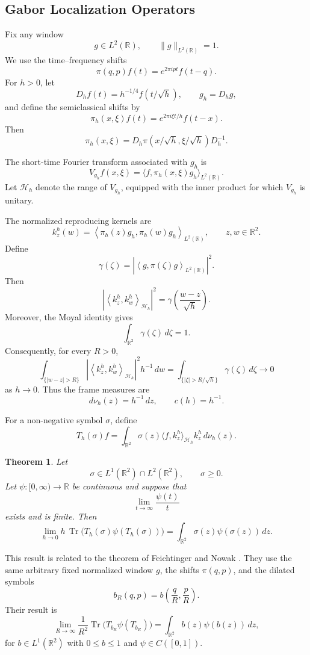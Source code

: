 \documentclass{amsart}
\newtheorem{thm}{Theorem}[section]
\theoremstyle{definition}
\theoremstyle{remark}
\numberwithin{equation}{section}
\begin{document}
\subsection{Gabor Localization Operators}

Fix any window
\[
g\in L^2(\mathbb R),
\qquad
\|g\|_{L^2(\mathbb R)}=1.
\]
We use the time--frequency shifts
\[
\pi(q,p)f(t)=e^{2\pi i pt}f(t-q).
\]
For $h>0$, let
\[
D_hf(t)=h^{-1/4}f(t/\sqrt h),
\qquad
g_h=D_hg,
\]
and define the semiclassical shifts by
\[
\pi_h(x,\xi)f(t)
=
e^{2\pi i \xi t/h}f(t-x).
\]
Then
\[
\pi_h(x,\xi)
=
D_h\pi(x/\sqrt h,\xi/\sqrt h)D_h^{-1}.
\]

The short-time Fourier transform associated with $g_h$ is
\[
V_{g_h}f(x,\xi)
=
\langle f,\pi_h(x,\xi)g_h\rangle_{L^2(\mathbb R)}.
\]
Let $\mathcal H_h$ denote the range of $V_{g_h}$, equipped with the
inner product for which $V_{g_h}$ is unitary.

The normalized reproducing kernels are
\[
k_z^h(w)
=
\left\langle
\pi_h(z)g_h,\pi_h(w)g_h
\right\rangle_{L^2(\mathbb R)},
\qquad z,w\in\mathbb R^2.
\]
Define
\[
\gamma(\zeta)
=
\left|
\left\langle g,\pi(\zeta)g\right\rangle_{L^2(\mathbb R)}
\right|^2.
\]
Then
\[
\left|
\left\langle k_z^h,k_w^h\right\rangle_{\mathcal H_h}
\right|^2
=
\gamma\left(\frac{w-z}{\sqrt h}\right).
\]
Moreover, the Moyal identity gives
\[
\int_{\mathbb R^2}\gamma(\zeta)\,d\zeta=1.
\]
Consequently, for every $R>0$,
\[
\int_{\{|w-z|>R\}}
\left|
\left\langle k_z^h,k_w^h\right\rangle_{\mathcal H_h}
\right|^2
h^{-1}\,dw
=
\int_{\{|\zeta|>R/\sqrt h\}}\gamma(\zeta)\,d\zeta
\longrightarrow 0
\]
as $h\to0$. Thus the frame measures are
\[
d\nu_h(z)=h^{-1}\,dz,
\qquad
c(h)=h^{-1}.
\]

For a non-negative symbol $\sigma$, define
\[
T_h(\sigma)f
=
\int_{\mathbb R^2}
\sigma(z)
\langle f,k_z^h\rangle_{\mathcal H_h}
k_z^h\,d\nu_h(z).
\]

\begin{thm}\label{FeiNow}
Let
\[
\sigma\in L^1(\mathbb R^2)\cap L^2(\mathbb R^2),
\qquad
\sigma\geq0.
\]
Let $\psi:[0,\infty)\to\mathbb R$ be continuous and suppose that
\[
\lim_{t\to\infty}\frac{\psi(t)}{t}
\]
exists and is finite. Then
\[
\lim_{h\to0}
h\,\operatorname{Tr}
\bigl(T_h(\sigma)\psi(T_h(\sigma))\bigr)
=
\int_{\mathbb R^2}
\sigma(z)\psi(\sigma(z))\,dz.
\]
\end{thm}

This result is related to the theorem of Feichtinger and Nowak
\cite{FN01}. They use the same arbitrary fixed normalized
window $g$, the shifts $\pi(q,p)$, and the dilated symbols
\[
b_R(q,p)=b\left(\frac{q}{R},\frac{p}{R}\right).
\]
Their result is
\[
\lim_{R\to\infty}
\frac{1}{R^2}
\operatorname{Tr}
\bigl(T_{b_R}\psi(T_{b_R})\bigr)
=
\int_{\mathbb R^2}
b(z)\psi(b(z))\,dz,
\]
for $b\in L^1(\mathbb R^2)$ with $0\leq b\leq1$ and
$\psi\in C([0,1])$.
\end{document}
